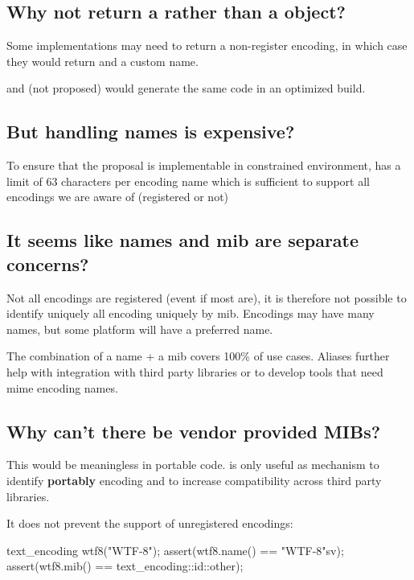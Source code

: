 \documentclass{wg21}
\begin{document}
\subsection{Why not return a  rather than a  object?}
Some implementations may need to return a non-register encoding, in which case they would return  and a custom name.

 and  (not proposed) would generate the same code in an optimized build.


\subsection{But handling names is expensive?}
To ensure that the proposal is implementable in constrained environment,  has a limit of 63 characters per encoding name
which is sufficient to support all encodings we are aware of (registered or not)

\subsection{It seems like names and mib are separate concerns?}

Not all encodings are registered (event if most are), it is therefore not possible to identify uniquely all encoding uniquely by mib.
Encodings may have many names, but some platform will have a preferred name.

The combination of a name + a mib covers 100\% of use cases. Aliases further help with integration with third party libraries or to develop
tools that need mime encoding names.

\subsection{Why can't there be vendor provided MIBs?}

This would be meaningless in portable code.  is only useful as mechanism to identify \textbf{portably} encoding and to increase compatibility across third party libraries.

It does not prevent the support of unregistered encodings:

\begin{codeblock}
    text_encoding wtf8("WTF-8");
    assert(wtf8.name() == "WTF-8"sv);
    assert(wtf8.mib() == text_encoding::id::other);
\end{codeblock}
\end{document}
